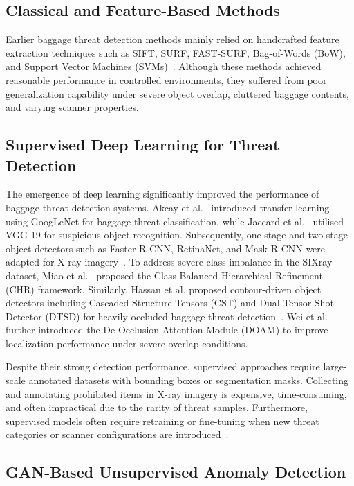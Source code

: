 \documentclass{bmvc2k}
\begin{document}
\subsection{Classical and Feature-Based Methods}

Earlier baggage threat detection methods mainly relied on handcrafted feature 
extraction techniques such as SIFT, SURF, FAST-SURF, Bag-of-Words (BoW), and 
Support Vector Machines (SVMs)~\cite{bastan2011,riffo2015,mery2016,kundegorski2016}. 
Although these methods achieved reasonable performance in controlled environments, 
they suffered from poor generalization capability under severe object overlap, 
cluttered baggage contents, and varying scanner properties.

\subsection{Supervised Deep Learning for Threat Detection}

The emergence of deep learning significantly improved the performance of baggage 
threat detection systems. Akcay et al.~\cite{akcay2016} introduced transfer learning 
using GoogLeNet for baggage threat classification, while Jaccard et al.~\cite{jaccard2017} 
utilised VGG-19 for suspicious object recognition. Subsequently, one-stage and 
two-stage object detectors such as Faster R-CNN, RetinaNet, and Mask R-CNN were 
adapted for X-ray imagery~\cite{liu2018,gaus2019a,gaus2019b}. To address severe 
class imbalance in the SIXray dataset, Miao et al.~\cite{miao2019sixray} proposed 
the Class-Balanced Hierarchical Refinement (CHR) framework. Similarly, Hassan et al. 
proposed contour-driven object detectors including Cascaded Structure Tensors (CST) 
and Dual Tensor-Shot Detector (DTSD) for heavily occluded baggage threat 
detection~\cite{hassan2020cst,hassan2020dtsd}. Wei et al.~\cite{wei2020doam} further 
introduced the De-Occlusion Attention Module (DOAM) to improve localization performance 
under severe overlap conditions.

Despite their strong detection performance, supervised approaches require large-scale 
annotated datasets with bounding boxes or segmentation masks. Collecting and annotating 
prohibited items in X-ray imagery is expensive, time-consuming, and often impractical 
due to the rarity of threat samples. Furthermore, supervised models often require 
retraining or fine-tuning when new threat categories or scanner configurations are 
introduced~\cite{gaus2019a}.

\subsection{GAN-Based Unsupervised Anomaly Detection}
\end{document}
